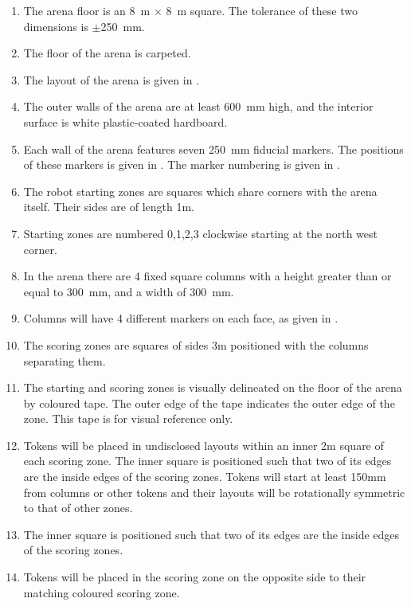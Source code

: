 \begin{enumerate}
  \item The arena floor is an \SI{8}{m} $\times$ \SI{8}{m} square. The tolerance
        of these two dimensions is $\pm$\SI{250}{mm}.
  \item The floor of the arena is carpeted.
  \item The layout of the arena is given in .
  \item The outer walls of the arena are at least \SI{600}{mm} high, and the
        interior surface is white plastic-coated hardboard.
  \item Each wall of the arena features seven \SI{250}{mm} fiducial markers.
        The positions of these markers is given in .
        The marker numbering is given in .
  \item The robot starting zones are squares which share corners with the arena
        itself. Their sides are of length \si{1}{m}.
  \item Starting zones are numbered 0,1,2,3 clockwise starting at the north west corner.
  \item In the arena there are 4 fixed square columns with a height greater than
        or equal to \SI{300}{mm}, and a width of \SI{300}{mm}.
  \item Columns will have 4 different markers on each face, as given in
        .
  \item The scoring zones are squares of sides \si{3}{m} positioned with the
        columns separating them.
  \item The starting and scoring zones is visually delineated on the floor of
        the arena by coloured tape. The outer edge of the tape indicates the
        outer edge of the zone. This tape is for visual reference only.
  \item \label{spec:tokenpos} Tokens will be placed in undisclosed layouts
        within an inner \si{2}{m} square of each scoring zone. The inner square
        is positioned such that two of its edges are the inside edges of the
        scoring zones. Tokens will start at least \si{150}{mm} from columns
        or other tokens and their layouts will be rotationally symmetric to
        that of other zones.
  \item The inner square is positioned such that two of its edges are the
        inside edges of the scoring zones.
  \item Tokens will be placed in the scoring zone on the opposite side to their
        matching coloured scoring zone.
\end{enumerate}

